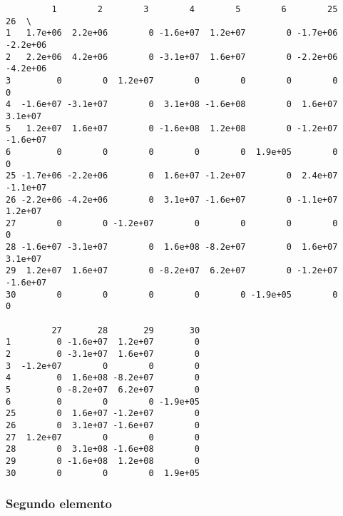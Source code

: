 \documentclass{article}
\begin{document}
    
    \begin{verbatim}
         1        2        3        4        5        6        25       26  \
1   1.7e+06  2.2e+06        0 -1.6e+07  1.2e+07        0 -1.7e+06 -2.2e+06   
2   2.2e+06  4.2e+06        0 -3.1e+07  1.6e+07        0 -2.2e+06 -4.2e+06   
3         0        0  1.2e+07        0        0        0        0        0   
4  -1.6e+07 -3.1e+07        0  3.1e+08 -1.6e+08        0  1.6e+07  3.1e+07   
5   1.2e+07  1.6e+07        0 -1.6e+08  1.2e+08        0 -1.2e+07 -1.6e+07   
6         0        0        0        0        0  1.9e+05        0        0   
25 -1.7e+06 -2.2e+06        0  1.6e+07 -1.2e+07        0  2.4e+07 -1.1e+07   
26 -2.2e+06 -4.2e+06        0  3.1e+07 -1.6e+07        0 -1.1e+07  1.2e+07   
27        0        0 -1.2e+07        0        0        0        0        0   
28 -1.6e+07 -3.1e+07        0  1.6e+08 -8.2e+07        0  1.6e+07  3.1e+07   
29  1.2e+07  1.6e+07        0 -8.2e+07  6.2e+07        0 -1.2e+07 -1.6e+07   
30        0        0        0        0        0 -1.9e+05        0        0   

         27       28       29       30  
1         0 -1.6e+07  1.2e+07        0  
2         0 -3.1e+07  1.6e+07        0  
3  -1.2e+07        0        0        0  
4         0  1.6e+08 -8.2e+07        0  
5         0 -8.2e+07  6.2e+07        0  
6         0        0        0 -1.9e+05  
25        0  1.6e+07 -1.2e+07        0  
26        0  3.1e+07 -1.6e+07        0  
27  1.2e+07        0        0        0  
28        0  3.1e+08 -1.6e+08        0  
29        0 -1.6e+08  1.2e+08        0  
30        0        0        0  1.9e+05  
    \end{verbatim}

    
    \subsubsection{Segundo elemento}\label{segundo-elemento}
\end{document}
